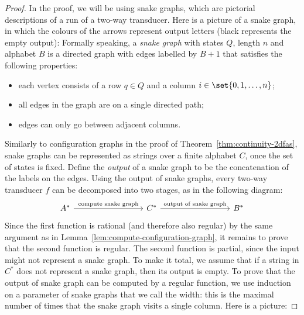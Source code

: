 \begin{proof}
    In the proof, we will be using snake graphs, which are pictorial descriptions of a run of a two-way transducer. Here is a picture of a snake graph, in which the colours of the arrows represent output letters (black represents the empty output):
    Formally speaking,  a \emph{snake graph} with states $Q$, length $n$ and alphabet $B$ is a directed graph with edges labelled by $B+1$  that satisfies the following properties:
    \begin{itemize}
        \item each vertex consists of a row $q \in Q$ and a column $i \in \set{0,1,\ldots,n}$;
        \item all edges in the graph are on a single directed path;
        \item edges can only go between adjacent columns.
    \end{itemize}
 Similarly to configuration graphs in the proof of Theorem~\ref{thm:continuity-2dfas}, snake graphs can be represented as strings over a finite alphabet $C$, once the set of states is fixed.     Define the \emph{output} of a snake graph to be the concatenation of the labels on the edges. Using the output of snake graphs, every two-way transducer $f$ can be decomposed into two stages, as in the following diagram:  \[
    \begin{tikzcd}[column sep=3cm]
    A^* \ar[r,"\text{compute snake graph}"] &
    C^* \ar[r,"\text{output of snake graph}"] & 
    B^*
    \end{tikzcd}
    \]
Since the first function is rational (and therefore also regular) by the same argument as in Lemma~\ref{lem:compute-configuration-graph}, it remains to prove that the second function is regular. 
    The second  function  is partial, since the input might not represent a snake graph. To make it total, we assume that if a string in $C^*$ does not represent a snake graph, then its output is empty. To prove that the output of snake graph can be computed by a regular function, we use induction on  a parameter of snake graphs that we call the width: this is the maximal number of times that the snake graph visits a single column. Here is a picture:


\end{proof}
